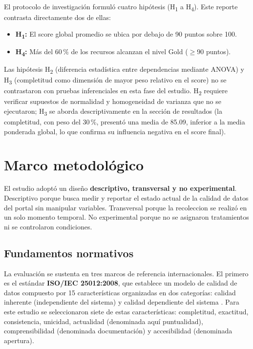 \documentclass[12pt,letterpaper]{article}
\begin{document}
El protocolo de investigaci\'on formul\'o cuatro hip\'otesis (H\textsubscript{1} a
H\textsubscript{4}). Este reporte contrasta directamente dos de ellas:

\begin{itemize}
  \item \textbf{H\textsubscript{1}:} El score global promedio se ubica por
    debajo de 90 puntos sobre 100.
  \item \textbf{H\textsubscript{4}:} M\'as del 60\,\% de los recursos
    alcanzan el nivel Gold ($\geq 90$ puntos).
\end{itemize}

\noindent Las hip\'otesis H\textsubscript{2} (diferencia estad\'istica entre
dependencias mediante ANOVA) y H\textsubscript{3} (completitud como dimensi\'on
de mayor peso relativo en el score) no se contrastaron con pruebas inferenciales
en esta fase del estudio. H\textsubscript{2} requiere verificar supuestos de
normalidad y homogeneidad de varianza que no se ejecutaron; H\textsubscript{3}
se aborda descriptivamente en la secci\'on de resultados (la completitud, con
peso del 30\,\%, present\'o una media de 85.09, inferior a la media ponderada
global, lo que confirma su influencia negativa en el score final).

\section{Marco metodol\'ogico}

El estudio adopt\'o un dise\~no \textbf{descriptivo, transversal y no
experimental}. Descriptivo porque busca medir y reportar el estado actual de
la calidad de datos del portal sin manipular variables. Transversal porque la
recoleccion se realiz\'o en un solo momento temporal. No experimental porque
no se asignaron tratamientos ni se controlaron condiciones.

\subsection{Fundamentos normativos}

La evaluaci\'on se sustenta en tres marcos de referencia internacionales. El primero es
el est\'andar \textbf{ISO/IEC 25012:2008}, que establece un modelo de calidad de datos
compuesto por 15 caracter\'isticas organizadas en dos categor\'ias: calidad inherente
(independiente del sistema) y calidad dependiente del sistema \parencite{iso25012}.
Para este estudio se seleccionaron siete de estas caracter\'isticas: completitud,
exactitud, consistencia, unicidad, actualidad (denominada aqu\'i puntualidad),
comprensibilidad (denominada documentaci\'on) y accesibilidad (denominada apertura).
\end{document}

